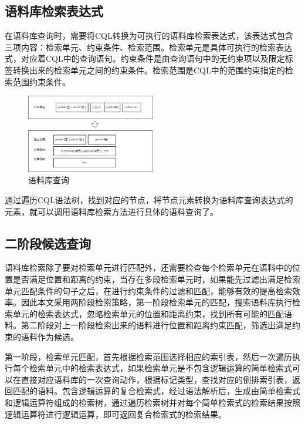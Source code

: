 \documentclass[11pt]{article}
\begin{document}
\begin{CJK*}{UTF8}{gbsn}
\subsection{语料库检索表达式}

在语料库查询时，需要将CQL转换为可执行的语料库检索表达式，该表达式包含三项内容：检索单元、约束条件、检索范围。检索单元是具体可执行的检索表达式，对应着CQL中的查询语句。约束条件是由查询语句中的无约束项以及限定标签转换出来的检索单元之间的约束条件。检索范围是CQL中的范围约束指定的检索范围约束条件。

\begin{figure}[h]
	\centering
	\includegraphics[width=0.5\textwidth]{image/jiansuoshi.jpg}
	\caption{语料库查询}
	\label{fig:jisnsuoshi}
\end{figure}

通过遍历CQL语法树，找到对应的节点，将节点元素转换为语料库查询表达式的元素，就可以调用语料库检索方法进行具体的语料查询了。

\subsection{二阶段候选查询}

语料库检索除了要对检索单元进行匹配外，还需要检查每个检索单元在语料中的位置是否满足位置和距离的约束，当存在多段检索单元时，如果能先过滤出满足检索单元匹配条件的句子之后，在进行约束条件的过滤和匹配，能够有效的提高检索效率。因此本文采用两阶段检索策略，第一阶段检索单元的匹配，搜索语料库执行检索单元的检索表达式，忽略检索单元的位置和距离约束，找到所有可能的匹配语料。第二阶段对上一阶段检索出来的语料进行位置和距离约束匹配，筛选出满足约束的语料作为候选。

第一阶段，检索单元匹配，首先根据检索范围选择相应的索引表，然后一次遍历执行每个检索单元中的检索表达式，如果检索单元是不包含逻辑运算的简单检索式可以在直接对应语料库的一次查询动作，根据标记类型，查找对应的倒排索引表，返回匹配的语料。包含逻辑运算的复合检索式，经过语法解析后，生成由简单检索式和逻辑运算符组成的检索树，通过遍历检索树并对每个简单检索式的检索结果按照逻辑运算符进行逻辑运算，即可返回复合检索式的检索结果。


\end{CJK*}
\end{document}
